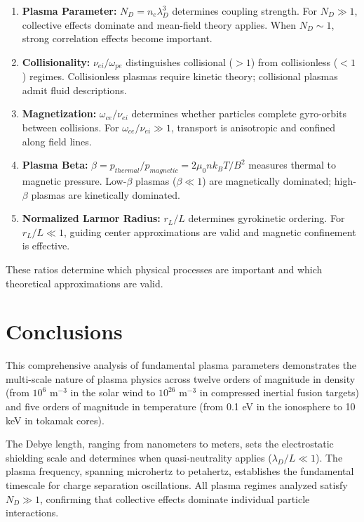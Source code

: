 \documentclass[11pt,a4paper]{article}
\begin{document}
\begin{enumerate}
\item \textbf{Plasma Parameter:} $N_D = n_e \lambda_D^3$ determines coupling strength. For $N_D \gg 1$, collective effects dominate and mean-field theory applies. When $N_D \sim 1$, strong correlation effects become important.

\item \textbf{Collisionality:} $\nu_{ei} / \omega_{pe}$ distinguishes collisional ($> 1$) from collisionless ($< 1$) regimes. Collisionless plasmas require kinetic theory; collisional plasmas admit fluid descriptions.

\item \textbf{Magnetization:} $\omega_{ce} / \nu_{ei}$ determines whether particles complete gyro-orbits between collisions. For $\omega_{ce}/\nu_{ei} \gg 1$, transport is anisotropic and confined along field lines.

\item \textbf{Plasma Beta:} $\beta = p_{thermal} / p_{magnetic} = 2\mu_0 n k_B T / B^2$ measures thermal to magnetic pressure. Low-$\beta$ plasmas ($\beta \ll 1$) are magnetically dominated; high-$\beta$ plasmas are kinetically dominated.

\item \textbf{Normalized Larmor Radius:} $r_L / L$ determines gyrokinetic ordering. For $r_L/L \ll 1$, guiding center approximations are valid and magnetic confinement is effective.
\end{enumerate}

These ratios determine which physical processes are important and which theoretical approximations are valid.

\section{Conclusions}

This comprehensive analysis of fundamental plasma parameters demonstrates the multi-scale nature of plasma physics across twelve orders of magnitude in density (from $10^{6}$ m$^{-3}$ in the solar wind to $10^{26}$ m$^{-3}$ in compressed inertial fusion targets) and five orders of magnitude in temperature (from 0.1 eV in the ionosphere to 10 keV in tokamak cores).

The Debye length, ranging from nanometers to meters, sets the electrostatic shielding scale and determines when quasi-neutrality applies ($\lambda_D/L \ll 1$). The plasma frequency, spanning microhertz to petahertz, establishes the fundamental timescale for charge separation oscillations. All plasma regimes analyzed satisfy $N_D \gg 1$, confirming that collective effects dominate individual particle interactions.
\end{document}
